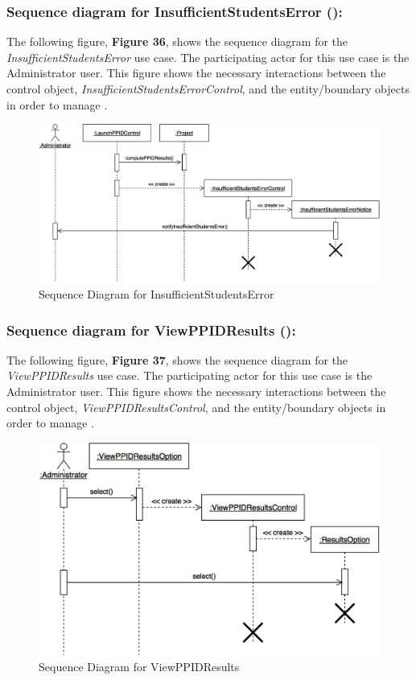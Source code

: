 \documentclass[12pt,letterpaper]{article}
\begin{document}
\subsubsection*{Sequence diagram for InsufficientStudentsError (\insufficientstudentserror{}):}

The following figure, {\bf Figure 36}, shows the sequence diagram for the {\it InsufficientStudentsError} use case. The participating actor for this use case is
the Administrator user. This figure shows the necessary interactions between the control object, {\it InsufficientStudentsErrorControl}, and the
entity/boundary objects in order to manage \insufficientstudentserror{}.

\begin{figure}[H]
	\centering{}
	\includegraphics[scale=0.3]{imgs/seq/insufficient-students-error.png}
	\caption{Sequence Diagram for InsufficientStudentsError}
\end{figure}

\subsubsection*{Sequence diagram for ViewPPIDResults (\viewppidresults{}):}

The following figure, {\bf Figure 37}, shows the sequence diagram for the {\it ViewPPIDResults} use case. The participating actor for this use case is
the Administrator user. This figure shows the necessary interactions between the control object, {\it ViewPPIDResultsControl}, and the
entity/boundary objects in order to manage \viewppidresults{}.

\begin{figure}[H]
	\centering{}
	\includegraphics[scale=0.3]{imgs/seq/view-ppid-results.png}
	\caption{Sequence Diagram for ViewPPIDResults}
\end{figure}
\end{document}
